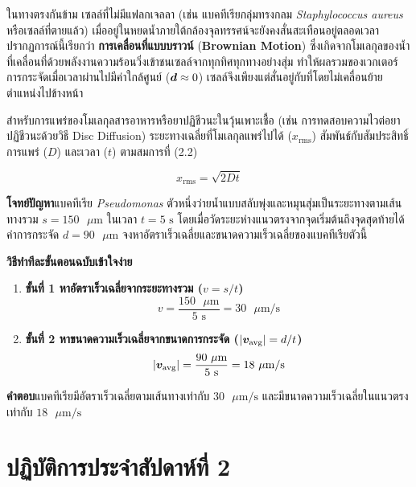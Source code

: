 ในทางตรงกันข้าม เซลล์ที่ไม่มีแฟลกเจลลา (เช่น แบคทีเรียกลุ่มทรงกลม \textit{Staphylococcus aureus} หรือเซลล์ที่ตายแล้ว) เมื่ออยู่ในหยดน้ำภายใต้กล้องจุลทรรศน์จะยังคงสั่นสะเทือนอยู่ตลอดเวลา ปรากฏการณ์นี้เรียกว่า \textbf{การเคลื่อนที่แบบบราวน์} (\textbf{Brownian Motion}) ซึ่งเกิดจากโมเลกุลของน้ำที่เคลื่อนที่ด้วยพลังงานความร้อนวิ่งเข้าชนเซลล์จากทุกทิศทุกทางอย่างสุ่ม ทำให้ผลรวมของเวกเตอร์การกระจัดเมื่อเวลาผ่านไปมีค่าใกล้ศูนย์ ($\bm{d} \approx 0$) เซลล์จึงเพียงแต่สั่นอยู่กับที่โดยไม่เคลื่อนย้ายตำแหน่งไปข้างหน้า

สำหรับการแพร่ของโมเลกุลสารอาหารหรือยาปฏิชีวนะในวุ้นเพาะเชื้อ (เช่น การทดสอบความไวต่อยาปฏิชีวนะด้วยวิธี Disc Diffusion) ระยะทางเฉลี่ยที่โมเลกุลแพร่ไปได้ ($x_{\text{rms}}$) สัมพันธ์กับสัมประสิทธิ์การแพร่ ($D$) และเวลา ($t$) ตามสมการที่ (2.2)

\begin{equation}
    x_{\text{rms}} = \sqrt{2 D t}
\end{equation}

\begin{worked}
\textbf{โจทย์ปัญหา}\quad แบคทีเรีย \textit{Pseudomonas} ตัวหนึ่งว่ายน้ำแบบสลับพุ่งและหมุนสุ่มเป็นระยะทางตามเส้นทางรวม $s = 150\text{ }\mu\text{m}$ ในเวลา $t = 5\text{ s}$ โดยเมื่อวัดระยะห่างแนวตรงจากจุดเริ่มต้นถึงจุดสุดท้ายได้ค่าการกระจัด $d = 90\text{ }\mu\text{m}$ จงหาอัตราเร็วเฉลี่ยและขนาดความเร็วเฉลี่ยของแบคทีเรียตัวนี้

\textbf{วิธีทำทีละขั้นตอนฉบับเข้าใจง่าย}
\begin{enumerate}
    \item \textbf{ขั้นที่ 1 หาอัตราเร็วเฉลี่ยจากระยะทางรวม ($v = s / t$)}
    \[
        v = \frac{150\text{ }\mu\text{m}}{5\text{ s}} = 30\text{ }\mu\text{m/s}
    \]
    \item \textbf{ขั้นที่ 2 หาขนาดความเร็วเฉลี่ยจากขนาดการกระจัด ($|\bm{v}_{\text{avg}}| = d / t$)}
    \[
        |\bm{v}_{\text{avg}}| = \frac{90\text{ }\mu\text{m}}{5\text{ s}} = 18\text{ }\mu\text{m/s}
    \]
\end{enumerate}
\textbf{คำตอบ}\quad แบคทีเรียมีอัตราเร็วเฉลี่ยตามเส้นทางเท่ากับ $30\text{ }\mu\text{m/s}$ และมีขนาดความเร็วเฉลี่ยในแนวตรงเท่ากับ $18\text{ }\mu\text{m/s}$
\end{worked}

\section{ปฏิบัติการประจำสัปดาห์ที่ 2}

